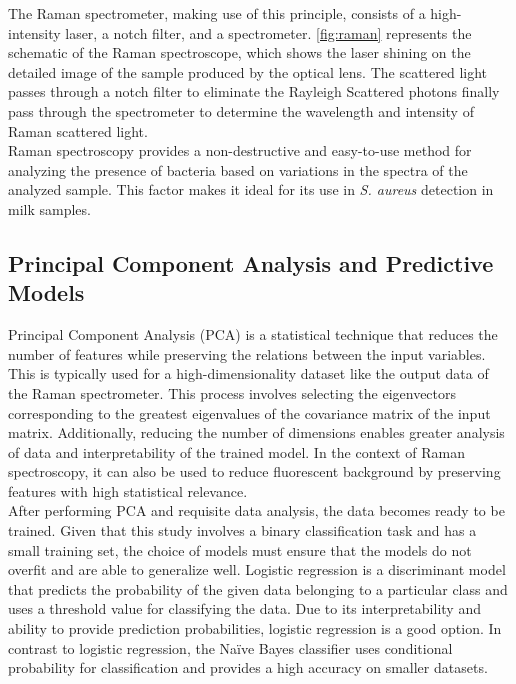 \noindent The Raman spectrometer, making use of this principle, consists of a high-intensity laser, a notch filter, and a spectrometer. \autoref{fig:raman} represents the schematic of the Raman spectroscope, which shows the laser shining on the detailed image of the sample produced by the optical lens. The scattered light passes through a notch filter to eliminate the Rayleigh Scattered photons finally pass through the spectrometer to determine the wavelength and intensity of Raman scattered light. \\

\noindent Raman spectroscopy provides a non-destructive and easy-to-use method for analyzing the presence of bacteria based on variations in the spectra of the analyzed sample. This factor makes it ideal for its use in \textit{S. aureus} detection in milk samples. 

\subsection{Principal Component Analysis and Predictive Models}

Principal Component Analysis (PCA) is a statistical technique that reduces the number of features while preserving the relations between the input variables. This is typically used for a high-dimensionality dataset like the output data of the Raman spectrometer. \cite{Greenacre2022PCA}  This process involves selecting the eigenvectors corresponding to the greatest eigenvalues of the covariance matrix of the input matrix. \cite{Shalizi2022Ch18} Additionally, reducing the number of dimensions enables greater analysis of data and interpretability of the trained model. \cite{Woodgate2016RSTA} In the context of Raman spectroscopy, it can also be used to reduce fluorescent background by preserving features with high statistical relevance. \\ 

\noindent After performing PCA and requisite data analysis, the data becomes ready to be trained. Given that this study involves a binary classification task and has a small training set, the choice of models must ensure that the models do not overfit and are able to generalize well. Logistic regression is a discriminant model that predicts the probability of the given data belonging to a particular class and uses a threshold value for classifying the data. Due to its interpretability and ability to provide prediction probabilities, logistic regression is a good option. \cite{JurafskySLP3_Ch5}  In contrast to logistic regression, the Naïve Bayes classifier uses conditional probability for classification and provides a high accuracy on smaller datasets. \cite{Anonymous2012NaiveBayesRG} \\

